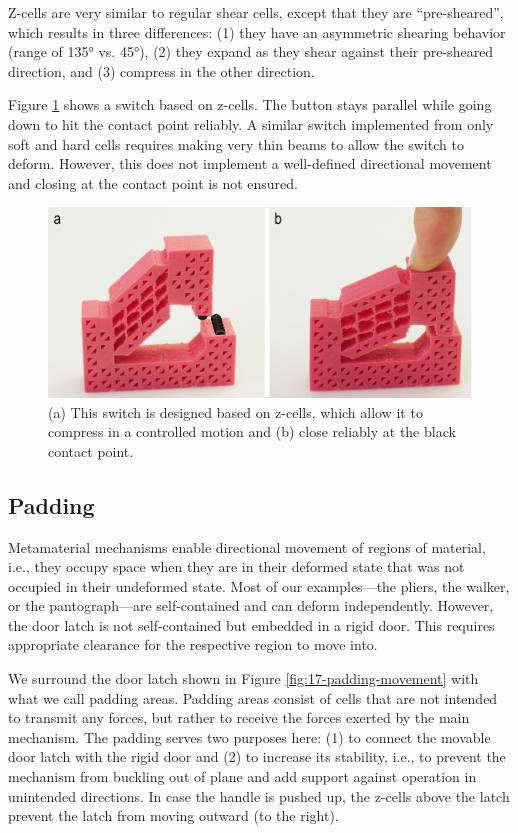 Z-cells are very similar to regular shear cells, except that they are “pre-sheared”, which results in three differences: (1) they have an asymmetric shearing behavior (range of 135° vs. 45°), (2) they expand as they shear against their pre-sheared direction, and (3) compress in the other direction.

Figure \ref{fig:16-switch} shows a switch based on z-cells. The button stays parallel while going down to hit the contact point reliably. A similar switch implemented from only soft and hard cells requires making very thin beams to allow the switch to deform. However, this does not implement a well-defined directional movement and closing at the contact point is not ensured.

\begin{figure} [h]
    \includegraphics[width=\textwidth]{chapters/metamaterial-mechanisms-FIG/16-switch.pdf}
    \caption[Short figure name.]{(a) This switch is designed based on z-cells, which allow it to compress in a controlled motion and (b) close reliably at the black contact point. 
    \label{fig:16-switch}}
\end{figure}


\subsection{Padding}

Metamaterial mechanisms enable directional movement of regions of material, i.e., they occupy space when they are in their deformed state that was not occupied in their undeformed state. Most of our examples---the pliers, the walker, or the pantograph---are self-contained and can deform independently. However, the door latch is not self-contained but embedded in a rigid door. This requires appropriate clearance for the respective region to move into. 

We surround the door latch shown in Figure \ref{fig:17-padding-movement} with what we call padding areas. Padding areas consist of cells that are not intended to transmit any forces, but rather to receive the forces exerted by the main mechanism. The padding serves two purposes here: (1) to connect the movable door latch with the rigid door and (2) to increase its stability, i.e., to prevent the mechanism from buckling out of plane and add support against operation in unintended directions. In case the handle is pushed up, the z-cells above the latch prevent the latch from moving outward (to the right).

